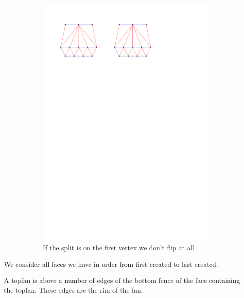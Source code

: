 \begin{figure}
\begin{subfigure}[b]{0.45 \textwidth}
    \end{subfigure}
    ~
    \begin{subfigure}[b]{0.45 \textwidth}
        \includegraphics[width =\textwidth]{topFanFlips/img/splitfront}
        \caption{If the split is on the first vertex we don't flip at all}
        \label{fig:fanflip:splitFirstVertex}

    \end{subfigure}

    \caption{}
    \label{fig:fanflip:fanflips}
\end{figure}



We consider all faces we have in order from first created to last created.

A topfan is above a number of edges of the bottom fence of the face containing the topfan. These edges are the rim of the fan.

